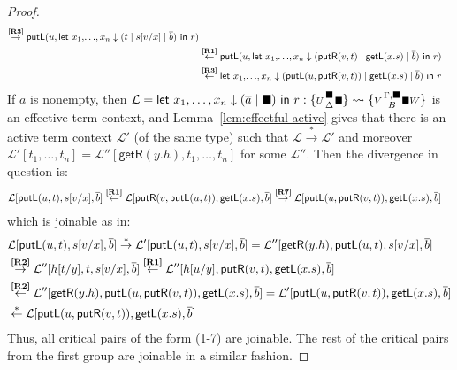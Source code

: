 \documentclass[twoside,11pt,final]{entics}
\newcommand{\getl}{\mathsf{getL}}
\newcommand{\putr}{\mathsf{putR}}
\newcommand{\getr}{\mathsf{getR}}
\newcommand{\putl}{\mathsf{putL}}
\newcommand{\wiggle}[4]{\{{\scriptstyle #1} {{\scriptstyle #2} \atop {\scriptstyle #3}} {\scriptstyle #4}\}}
\newcommand{\from}{\leftarrow}
\newcommand{\asn}{\downarrow}
\newcommand{\seq}{,\!\ldots\!,}
\begin{document}
\begin{proof}
\begin{align*}
    \overset{\text{\bf[R3]}}{\to} \putl(u,\textsf{let } x_1 \seq x_n \asn (t \mid s[v/x] \mid \overline{b}) \textsf{ in } r)
    \\& \overset{\text{\bf[R1]}}{\from} \putl(u,\textsf{let } x_1 \seq x_n \asn (\putr(v,t) \mid \getl(x.s) \mid \overline{b}) \textsf{ in } r)
    \\& \overset{\text{\bf[R3]}}{\from} \textsf{let } x_1 \seq x_n \asn (\putl(u,\putr(v,t)) \mid \getl(x.s) \mid \overline{b}) \textsf{ in } r 
  \end{align*}
  If $\overline{a}$ is nonempty, then $\mathcal{L} = \textsf{let } x_1,\ldots,x_n \asn (\overline{a} \mid \blacksquare) \textsf{ in } r : \wiggle{U}{\blacksquare}{\Delta}{\blacksquare} \rightsquigarrow \wiggle{V}{\Gamma,\blacksquare}{B}{\blacksquare W}$ is an effective term context, and Lemma~\ref{lem:effectful-active} gives that there is an active term context $\mathcal{L}'$ (of the same type) such that $\mathcal{L} \stackrel{*}{\to} \mathcal{L}'$ and moreover $\mathcal{L}'[t_1 \seq t_n] = \mathcal{L}''[\getr(y.h),t_1,\ldots,t_n]$ for some $\mathcal{L}''$. Then the divergence in question is:
  \begin{align*}
    & \mathcal{L}[\putl(u,t),s[v/x],\overline{b}]
    \overset{\text{\bf[R1]}}{\from} \mathcal{L}[\putr(v,\putl(u,t)),\getl(x.s), \overline{b}]
    \overset{\text{\bf[R7]}}{\to} \mathcal{L}[\putl(u,\putr(v,t)),\getl(x.s),\overline{b}]
  \end{align*}
which is joinable as in:
\begin{align*}
  & \mathcal{L}[\putl(u,t) , s[v/x] , \overline{b}]
    \stackrel{*}{\to} \mathcal{L}'[\putl(u,t) , s[v/x] , \overline{b}]
    = \mathcal{L}''[\getr(y.h) , \putl(u,t) , s[v/x] , \overline{b}]
  \\& \overset{\text{\bf[R2]}}{\to} \mathcal{L}''[h[t/y] , t , s[v/x] , \overline{b}]
  \overset{\text{\bf[R1]}}{\from} \mathcal{L}''[h[u/y] ,\putr(v,t) , \getl(x.s) , \overline{b}]
  \\& \overset{\text{\bf[R2]}}{\from} \mathcal{L}''[\getr(y.h) , \putl(u,\putr(v,t)) , \getl(x.s) , \overline{b}]
  = \mathcal{L}'[\putl(u,\putr(v,t)) , \getl(x.s) , \overline{b}]
  \\& \stackrel{*}{\from} \mathcal{L}[\putl(u,\putr(v,t)) , \getl(x.s) , \overline{b}]
\end{align*}
Thus, all critical pairs of the form (1-7) are joinable. The rest of the critical pairs from the first group are joinable in a similar fashion. 


\end{proof}
\end{document}
